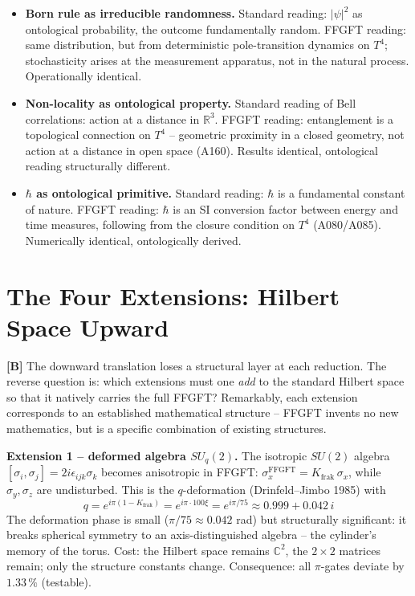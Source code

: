 \begin{itemize}[leftmargin=2em,itemsep=3pt,topsep=3pt]
  \item \textbf{Born rule as irreducible randomness.} Standard reading: $|\psi|^2$
    as ontological probability, the outcome fundamentally random. FFGFT reading:
    same distribution, but from deterministic pole-transition dynamics on $T^4$;
    stochasticity arises at the measurement apparatus, not in the natural process.
    Operationally identical.
  \item \textbf{Non-locality as ontological property.} Standard reading of Bell
    correlations: action at a distance in $\mathbb{R}^3$. FFGFT reading:
    entanglement is a topological connection on $T^4$ -- geometric proximity in a
    closed geometry, not action at a distance in open space (A160). Results
    identical, ontological reading structurally different.
  \item \textbf{$\hbar$ as ontological primitive.} Standard reading: $\hbar$ is a
    fundamental constant of nature. FFGFT reading: $\hbar$ is an SI conversion
    factor between energy and time measures, following from the closure condition
    on $T^4$ (A080/A085). Numerically identical, ontologically derived.
\end{itemize}

\section{The Four Extensions: Hilbert Space Upward}

\textbf{[B]} The downward translation loses a structural layer at each reduction.
The reverse question is: which extensions must one \emph{add} to the standard
Hilbert space so that it natively carries the full FFGFT? Remarkably, each
extension corresponds to an established mathematical structure -- FFGFT invents no
new mathematics, but is a specific combination of existing structures.

\textbf{Extension 1 -- deformed algebra $SU_q(2)$.} The isotropic $SU(2)$ algebra
$[\sigma_i,\sigma_j]=2i\epsilon_{ijk}\sigma_k$ becomes anisotropic in FFGFT:
$\sigma_x^{\text{FFGFT}} = K_{\text{frak}}\,\sigma_x$, while $\sigma_y,\sigma_z$
are undisturbed. This is the $q$-deformation (Drinfeld--Jimbo 1985) with
\[
  \boxed{\;q = e^{i\pi(1-K_{\text{frak}})} = e^{i\pi\cdot100\xi} = e^{i\pi/75}
        \approx 0{.}999 + 0{.}042\,i\;}
\]
The deformation phase is small ($\pi/75\approx0{.}042$ rad) but structurally
significant: it breaks spherical symmetry to an axis-distinguished algebra --
the cylinder's memory of the torus. Cost: the Hilbert space remains $\mathbb{C}^2$,
the $2\times2$ matrices remain; only the structure constants change. Consequence:
all $\pi$-gates deviate by $1{.}33\,\%$ (testable).

